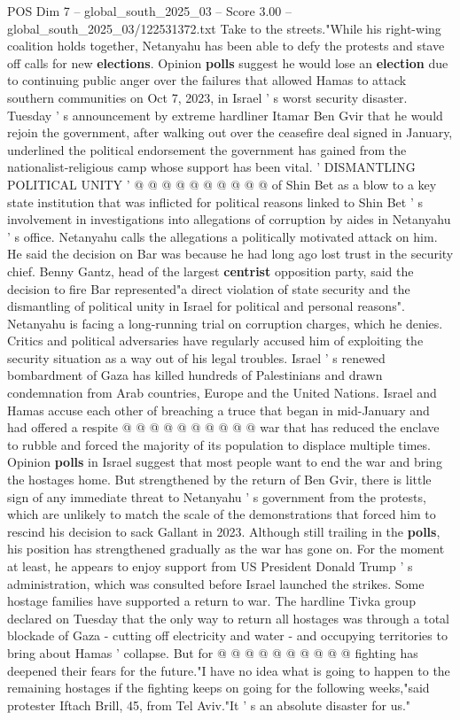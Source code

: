 \begin{textsample}{POS Dim 7 – global\_south\_2025\_03 – Score 3.00 – global\_south\_2025\_03/122531372.txt}
Take to the streets."While his right-wing coalition holds together, Netanyahu has been able to defy the protests and stave off calls for new \textbf{elections}.
Opinion \textbf{polls} suggest he would lose an \textbf{election} due to continuing public anger over the failures that allowed Hamas to attack southern communities on Oct 7, 2023, in Israel ' s worst security disaster.
Tuesday ' s announcement by extreme hardliner Itamar Ben Gvir that he would rejoin the government, after walking out over the ceasefire deal signed in January, underlined the political endorsement the government has gained from the nationalist-religious camp whose support has been vital. ' DISMANTLING POLITICAL UNITY ' @ @ @ @ @ @ @ @ @ @ of Shin Bet as a blow to a key state institution that was inflicted for political reasons linked to Shin Bet ' s involvement in investigations into allegations of corruption by aides in Netanyahu ' s office.
Netanyahu calls the allegations a politically motivated attack on him.
He said the decision on Bar was because he had long ago lost trust in the security chief.
Benny Gantz, head of the largest \textbf{centrist} opposition party, said the decision to fire Bar represented"a direct violation of state security and the dismantling of political unity in Israel for political and personal reasons".
Netanyahu is facing a long-running trial on corruption charges, which he denies.
Critics and political adversaries have regularly accused him of exploiting the security situation as a way out of his legal troubles.
Israel ' s renewed bombardment of Gaza has killed hundreds of Palestinians and drawn condemnation from Arab countries, Europe and the United Nations.
Israel and Hamas accuse each other of breaching a truce that began in mid-January and had offered a respite @ @ @ @ @ @ @ @ @ @ war that has reduced the enclave to rubble and forced the majority of its population to displace multiple times.
Opinion \textbf{polls} in Israel suggest that most people want to end the war and bring the hostages home.
But strengthened by the return of Ben Gvir, there is little sign of any immediate threat to Netanyahu ' s government from the protests, which are unlikely to match the scale of the demonstrations that forced him to rescind his decision to sack Gallant in 2023.
Although still trailing in the \textbf{polls}, his position has strengthened gradually as the war has gone on.
For the moment at least, he appears to enjoy support from US President Donald Trump ' s administration, which was consulted before Israel launched the strikes.
Some hostage families have supported a return to war.
The hardline Tivka group declared on Tuesday that the only way to return all hostages was through a total blockade of Gaza - cutting off electricity and water - and occupying territories to bring about Hamas ' collapse.
But for @ @ @ @ @ @ @ @ @ @ fighting has deepened their fears for the future."I have no idea what is going to happen to the remaining hostages if the fighting keeps on going for the following weeks,"said protester Iftach Brill, 45, from Tel Aviv."It ' s an absolute disaster for us."

\end{textsample}

